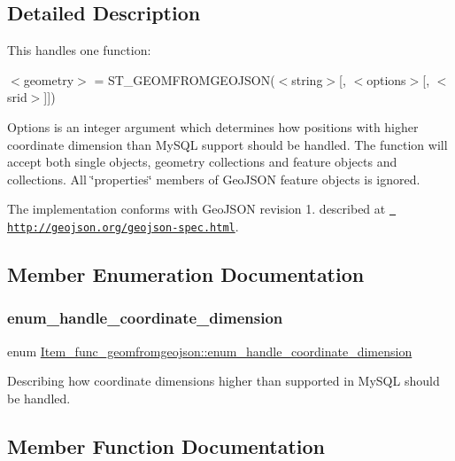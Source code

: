 \subsection{Detailed Description}
This handles one function\+:

$<$geometry$>$ = S\+T\+\_\+\+G\+E\+O\+M\+F\+R\+O\+M\+G\+E\+O\+J\+S\+O\+N($<$string$>$\mbox{[}, $<$options$>$\mbox{[}, $<$srid$>$\mbox{]}\mbox{]})

Options is an integer argument which determines how positions with higher coordinate dimension than My\+S\+QL support should be handled. The function will accept both single objects, geometry collections and feature objects and collections. All \char`\"{}properties\char`\"{} members of Geo\+J\+S\+ON feature objects is ignored.

The implementation conforms with Geo\+J\+S\+ON revision 1. described at \href{http://geojson.org/geojson-spec.html}\texttt{ http\+://geojson.\+org/geojson-\/spec.\+html}. 

\subsection{Member Enumeration Documentation}
\mbox{\label{classItem__func__geomfromgeojson_af387fb89b59818974b00c81624079245}} 
\subsubsection{\texorpdfstring{enum\+\_\+handle\+\_\+coordinate\+\_\+dimension}{enum\_handle\_coordinate\_dimension}}
{\footnotesize\ttfamily enum \mbox{\hyperlink{classItem__func__geomfromgeojson_af387fb89b59818974b00c81624079245}{Item\+\_\+func\+\_\+geomfromgeojson\+::enum\+\_\+handle\+\_\+coordinate\+\_\+dimension}}}

Describing how coordinate dimensions higher than supported in My\+S\+QL should be handled. 

\subsection{Member Function Documentation}
\mbox{\label{classItem__func__geomfromgeojson_a9fc13ed90caf5dc7082535f71766e8ea}} 

